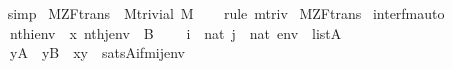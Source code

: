 \begin{isabellebody}
\ \ \isamarkupfalse%
\ simp%
\endisatagproof
{\isafoldproof}%
%
\isadelimproof
\isanewline
%
\endisadelimproof
\isanewline
{}\isamarkupfalse%
\isanewline
\isanewline
{}\isamarkupfalse%
\ M{\isacharunderscore}{\kern0pt}ZF{\isacharunderscore}{\kern0pt}trans\ {\isasymsubseteq}\ M{\isacharunderscore}{\kern0pt}trivial\ {\isachardoublequoteopen}{\isacharhash}{\kern0pt}{\isacharhash}{\kern0pt}M{\isachardoublequoteclose}\isanewline
%
\isadelimproof
\ \ %
\endisadelimproof
%
\isatagproof
{}\isamarkupfalse%
\ {\isacharparenleft}{\kern0pt}rule\ mtriv{\isacharparenright}{\kern0pt}%
\endisatagproof
{\isafoldproof}%
%
\isadelimproof
\isanewline
%
\endisadelimproof
\isanewline
{}\isamarkupfalse%
\ M{\isacharunderscore}{\kern0pt}ZF{\isacharunderscore}{\kern0pt}trans\isanewline
{}%
\isadelimdocument
%
\endisadelimdocument
%
\isatagdocument
%
\isamarkuptrue%
%
\endisatagdocument
{\isafolddocument}%
%
\isadelimdocument
%
\endisadelimdocument
{}\isamarkupfalse%
\ inter{\isacharunderscore}{\kern0pt}fm{\isacharunderscore}{\kern0pt}auto{\isacharcolon}{\kern0pt}\isanewline
\ \ \isanewline
\ \ \ \ {\isachardoublequoteopen}nth{\isacharparenleft}{\kern0pt}i{\isacharcomma}{\kern0pt}env{\isacharparenright}{\kern0pt}\ {\isacharequal}{\kern0pt}\ x{\isachardoublequoteclose}\ {\isachardoublequoteopen}nth{\isacharparenleft}{\kern0pt}j{\isacharcomma}{\kern0pt}env{\isacharparenright}{\kern0pt}\ {\isacharequal}{\kern0pt}\ B{\isachardoublequoteclose}\isanewline
\ \ \ \ {\isachardoublequoteopen}i\ {\isasymin}\ nat{\isachardoublequoteclose}\ {\isachardoublequoteopen}j\ {\isasymin}\ nat{\isachardoublequoteclose}\ {\isachardoublequoteopen}env\ {\isasymin}\ list{\isacharparenleft}{\kern0pt}A{\isacharparenright}{\kern0pt}{\isachardoublequoteclose}\isanewline
\ \ \isanewline
\ \ \ \ {\isachardoublequoteopen}{\isacharparenleft}{\kern0pt}{\isasymforall}y{\isasymin}A\ {\isachardot}{\kern0pt}\ y{\isasymin}B\ {\isasymlongrightarrow}\ x{\isasymin}y{\isacharparenright}{\kern0pt}\ {\isasymlongleftrightarrow}\ sats{\isacharparenleft}{\kern0pt}A{\isacharcomma}{\kern0pt}{\isacharquery}{\kern0pt}ifm{\isacharparenleft}{\kern0pt}i{\isacharcomma}{\kern0pt}j{\isacharparenright}{\kern0pt}{\isacharcomma}{\kern0pt}env{\isacharparenright}{\kern0pt}{\isachardoublequoteclose}\isanewline
%
\isadelimproof
\ \ %
\endisadelimproof
%
\isatagproof
{}\isamarkupfalse%

\end{isabellebody}
